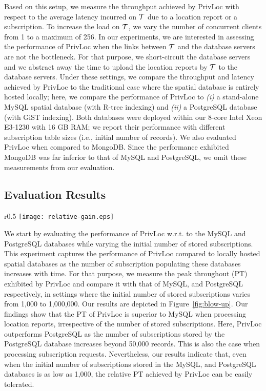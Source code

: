 \documentclass{llncs}
\newcommand\sol{{\sf PrivLoc}}
\begin{document}
Based on this setup, we measure the throughput achieved by \sol{} with respect to the average latency incurred on $\cal T$ due to a location report or a subscription. To increase the load on $\cal T$, we vary the number of concurrent clients from 1 to a maximum of 256. In our experiments, we are interested in assessing the performance of
\sol{} when the links between $\cal T$ and the database servers are not the bottleneck. For that purpose, we short-circuit the database servers and we abstract away the time to upload the location reports by $\cal T$ to the database servers.
Under these settings, we compare the throughput and latency achieved by \sol{} to the traditional case where the spatial database is entirely hosted locally; here, we compare the performance
of \sol{} to \emph{(i)} a stand-alone MySQL spatial database (with R-tree indexing) and \emph{(ii)} a PostgreSQL database (with GiST indexing). Both databases were deployed within our 8-core Intel Xeon E3-1230 with 16 GB RAM; we report their performance with different subscription table sizes (i.e., initial number of records). We also evaluated \sol{}
when compared to MongoDB. Since the performance exhibited MongoDB was far inferior to that of MySQL and PostgreSQL, we omit these measurements from our evaluation.




\subsection{Evaluation Results}

\begin{wrapfigure}{r}{0.5\textwidth}
\vspace{-5 em}
\texttt{[image: relative-gain.eps]}
\vspace{-2 em}
\caption{Comparison between \sol{} and local MySQL and PostgreSQL databases.}
\label{fig:blow-up}
\vspace{-2 em}
\end{wrapfigure}

We start by evaluating the performance of \sol{} w.r.t. to the MySQL and PostgreSQL databases while varying the initial number of stored subscriptions. This experiment captures the performance of \sol{} compared to locally hosted spatial databases as the number of subscription populating these databases increases with time. For that purpose, we measure the peak throughout (PT) exhibited by \sol{} and compare it with that of MySQL, and PostgreSQL respectively, in settings where the initial number of stored subscriptions varies from 1,000 to 1,000,000. Our results are depicted in Figure~\ref{fig:blow-up}. Our findings show that the PT of \sol{} is superior to MySQL when processing location reports, irrespective of the number of stored subscriptions. Here, \sol{} outperforms PostgreSQL as the number of subscriptions stored by the PostgreSQL database increases beyond 50,000 records. This is also the case when processing subscription requests. Nevertheless, our results indicate that, even when the initial number of subscriptions stored in the MySQL, and PostgreSQL databases is as low as 1,000, the relative PT achieved by \sol{} can be easily tolerated.
\end{document}
